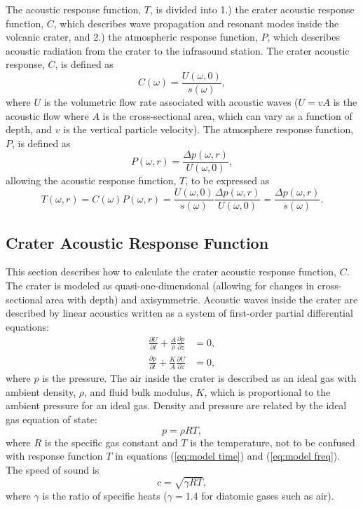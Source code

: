 \documentclass[10pt]{article}
\begin{document}
The acoustic response function, $T$, is divided into 1.) the crater acoustic response function, $C$, which describes wave propagation and resonant modes inside the volcanic crater, and 2.) the atmospheric response function, $P$, which describes acoustic radiation from the crater to the infrasound station. The crater acoustic response, $C$, is defined as
\begin{equation}
C(\omega) = \frac{U(\omega,0)}{s(\omega)},
\label{eq:crater response function}
\end{equation}
 where $U$ is the volumetric flow rate associated with acoustic waves ($U=vA$ is the acoustic flow where $A$ is the cross-sectional area, which can vary as a function of depth, and $v$ is the vertical particle velocity). The atmosphere response function, $P$, is defined as
\begin{equation}
P(\omega,r) = \frac{\Delta p(\omega,r)}{U(\omega,0)},
\label{eq:atmospheric response function}
\end{equation}
 allowing the acoustic response function, $T$, to be expressed as{}
\begin{equation}
T(\omega,r) = C(\omega) P(\omega,r) = \frac{U(\omega,0)}{s(\omega)} \frac{\Delta p(\omega,r)}{U(\omega,0)} = \frac{\Delta p(\omega,r)}{s(\omega)}.
\label{eq:transfer function}
\end{equation}

\subsection{Crater Acoustic Response Function}

This section describes how to calculate the crater acoustic response function, $C$. The crater is modeled as quasi-one-dimensional (allowing for changes in cross-sectional area with depth) and axisymmetric. Acoustic waves inside the crater are described by linear acoustics written as a system of first-order partial differential equations:
\begin{align}
\frac{\partial U}{\partial t} + \frac{A}{\rho} \frac{\partial p}{\partial z} & = 0, \\
\frac{\partial p}{\partial t} + \frac{K}{A} \frac{\partial U}{\partial z} & = 0,
\end{align}
where $p$ is the pressure. The air inside the crater is described as an ideal gas with ambient density, $\rho$, and fluid bulk modulus, $K$, which is  proportional  to the ambient pressure for an ideal gas. Density and pressure are related by the ideal gas equation of state:
\begin{equation}
p = \rho R T,
\label{eq:ideal gas}
\end{equation}
where $R$ is the specific gas constant and $T$ is the temperature, not to be confused with response function $T$ in equations (\ref{eq:model time}) and (\ref{eq:model freq}). The speed of sound is
\begin{equation}
c = \sqrt{\gamma R T},
\label{eq:sound speed}
\end{equation}
where $\gamma$ is the ratio of specific heats ($\gamma=1.4$ for diatomic gases such as air).
\end{document}
